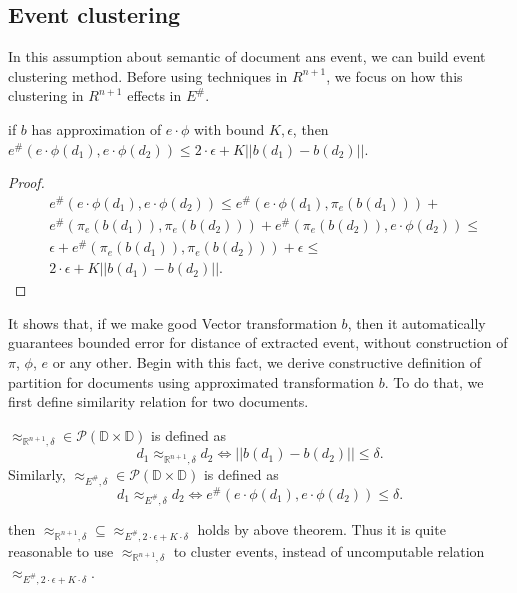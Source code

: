 \subsection{Event clustering}

In this assumption about semantic of document ans event, we can build event clustering method. Before using techniques in $R^{n+1}$, we
focus on how this clustering in $R^{n+1}$ effects in $E^{\#}$.

\begin{theorem}
    if $b$ has approximation of $e \cdot \phi$ with bound $K, \epsilon$, then $e^{\#}(e \cdot \phi(d_{1}), e \cdot \phi(d_{2})) \leq 2 \cdot \epsilon + K || b(d_{1}) - b(d_{2}) || $.
\end{theorem}

\begin{proof}
    \begin{align*}
     & e^{\#}(e \cdot \phi(d_{1}), e \cdot \phi(d_{2})) \leq e^{\#}(e \cdot \phi(d_{1}), \pi_{e}(b(d_{1}))) + \\
     & e^{\#}(\pi_{e}(b(d_{1})), \pi_{e}(b(d_{2}))) + e^{\#}(\pi_{e}(b(d_{2})), e \cdot \phi(d_{2})) \leq \\
     & \epsilon + e^{\#}(\pi_{e}(b(d_{1})), \pi_{e}(b(d_{2}))) + \epsilon \leq \\
     & 2 \cdot \epsilon + K || b(d_{1}) - b(d_{2}) ||.
    \end{align*}
\end{proof}

It shows that, if we make good Vector transformation $b$, then it automatically guarantees bounded error for distance of extracted event, without
construction of $\pi$, $\phi$, $e$ or any other. Begin with this fact, we derive constructive definition of partition for documents using approximated
transformation $b$. To do that, we first define similarity relation for two documents.

\begin{definition}
    $\approx_{\mathbb{R}^{n+1}, \delta} \in \mathcal{P}(\mathbb{D \times D})$ is defined as \begin{displaymath}
        d_{1} \approx_{\mathbb{R}^{n+1}, \delta} d_{2} \Longleftrightarrow || b(d_{1}) - b(d_{2}) || \leq \delta.
    \end{displaymath}
    Similarly, $\approx_{E^{\#}, \delta} \in \mathcal{P}(\mathbb{D \times D})$ is defined as \begin{displaymath}
    d_{1} \approx_{E^{\#}, \delta} d_{2} \Longleftrightarrow e^{\#}(e \cdot \phi(d_{1}), e \cdot \phi(d_{2})) \leq \delta.
    \end{displaymath}
\end{definition}
then $\approx_{\mathbb{R}^{n+1}, \delta} \subseteq \approx_{E^{\#}, 2 \cdot \epsilon + K \cdot \delta}$ holds by above theorem. Thus it is quite
reasonable to use $\approx_{\mathbb{R}^{n+1}, \delta}$ to cluster events, instead of uncomputable relation $\approx_{E^{\#}, 2 \cdot \epsilon + K \cdot \delta}$.

